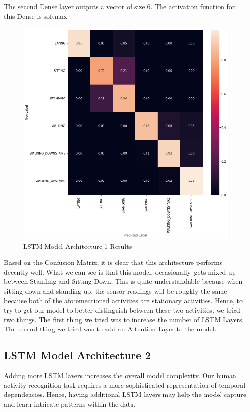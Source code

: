 \documentclass[11pt]{article}
\begin{document}
The second Dense layer outputs a vector of size 6. The activation function for this Dense is softmax \newline 

\begin{figure}[h!]
	\includegraphics[width= 0.9 \linewidth]{LSTM(1)_Results.png}
	\centering
	\caption{LSTM Model Architecture 1 Results}
	\label{LSTM(1)_Results.png}
\end{figure}

Based on the Confusion Matrix, it is clear that this architecture performs decently well. What we can see is that this model, occasionally, gets mixed up between Standing and Sitting Down. This is quite understandable because when sitting down and standing up, the sensor readings will be roughly the same because both of the aforementioned activities are stationary activities. Hence, to try to get our model to better distinguish between these two activities, we tried two things. The first thing we tried was to increase the number of LSTM Layers. The second thing we tried was to add an Attention Layer to the model. 


\subsection{LSTM Model Architecture 2}
Adding more LSTM layers increases the overall model complexity. Our human activity recognition task requires a more sophisticated representation of temporal dependencies. Hence, having additional LSTM layers may help the model capture and learn intricate patterns within the data. \newline 
\end{document}

